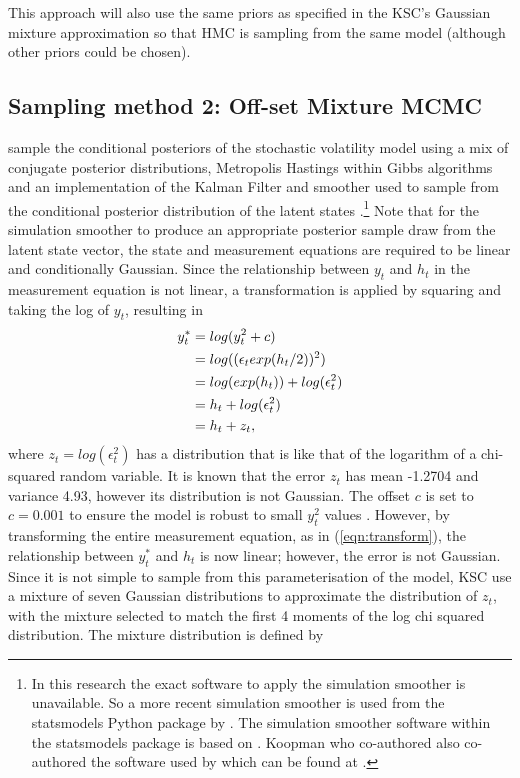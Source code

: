\documentclass[12pt, a4paper]{article}
\begin{document}
        This approach will also use the same priors as specified in the KSC's Gaussian mixture approximation so that HMC is sampling from the same model (although other priors could be chosen). 

    
    \subsection{Sampling method 2: Off-set Mixture MCMC}
        \citet{kim1998stochastic} sample the conditional posteriors of the stochastic volatility model using a mix of conjugate posterior distributions, Metropolis Hastings within Gibbs algorithms and an implementation of the Kalman Filter and smoother used to sample from the conditional posterior distribution of the latent states \citep{dejong1995}.\footnote{In this research the exact software to apply the simulation smoother is unavailable. So a more recent simulation smoother is used from the statsmodels Python package by \citet{seabold2010statsmodels}. The simulation smoother software within the statsmodels package is based on \citet{durbin2012time}. Koopman who co-authored \citet{durbin2012time} also co-authored the software used by \citet{kim1998stochastic} which can be found at \citet{koopman1996ssfpack}.} Note that for the simulation smoother to produce an appropriate posterior sample draw from the latent state vector, the state and measurement equations are required to be linear and conditionally Gaussian. Since the relationship between $y_t$ and $h_t$ in the measurement equation is not linear, a transformation is applied by squaring and taking the log of $y_t$, resulting in
        \begin{align}
        y_t^{*} &= log(y_t^2 + c) \notag\\ 
        &= log((\epsilon_t exp(h_t/2))^2) \notag\\
        &=  log(exp(h_t)) + log(\epsilon_t^2) \notag\\
        &= h_t + log(\epsilon_t^2) \notag  \\
        &= h_t + z_t,  \label{eqn:transform}
        \end{align}
        where $z_t = log(\epsilon_t^2)$ has a distribution that is like that of the logarithm of a chi-squared random variable. It is known that the error $z_t$ has mean -1.2704 and variance 4.93, however its distribution is not Gaussian. The offset $c$ is set to $c=0.001$ to ensure the model is robust to small $y_t^2$ values \citep{fuller1996introduction}. However, by transforming the entire measurement equation, as in (\ref{eqn:transform}), the relationship between $y_t^{*}$ and $h_t$ is now linear; however, the error is not Gaussian. Since it is not simple to sample from this parameterisation of the model, KSC use a mixture of seven Gaussian distributions to approximate the distribution of $z_t$, with the mixture selected to match the first 4 moments of the log chi squared distribution. The mixture distribution is defined by
\end{document}
